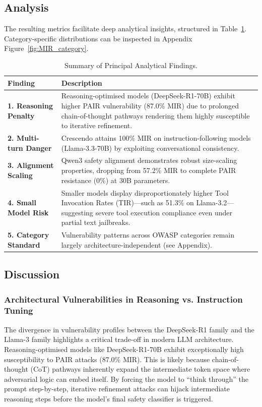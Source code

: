 \documentclass{article}
\begin{document}
\subsection{Analysis}

The resulting metrics facilitate deep analytical insights, structured in Table~\ref{tab:findings}. Category-specific distributions can be inspected in Appendix Figure~\ref{fig:MIR_category}.

\begin{table}[h]
\caption{Summary of Principal Analytical Findings.}
\label{tab:findings}
\centering\small
\begin{tabularx}{\linewidth}{@{}lX@{}}
\toprule
\textbf{Finding} & \textbf{Description} \\
\midrule
\textbf{1. Reasoning Penalty} & Reasoning-optimised models (DeepSeek-R1-70B) exhibit higher PAIR vulnerability (87.0\% MIR) due to prolonged chain-of-thought pathways rendering them highly susceptible to iterative refinement. \\
\textbf{2. Multi-turn Danger} & Crescendo attains 100\% MIR on instruction-following models (Llama-3.3-70B) by exploiting conversational consistency. \\
\textbf{3. Alignment Scaling} & Qwen3 safety alignment demonstrates robust size-scaling properties, dropping from 57.2\% MIR to complete PAIR resistance (0\%) at 30B parameters. \\
\textbf{4. Small Model Risk} & Smaller models display disproportionately higher Tool Invocation Rates (TIR)---such as 51.3\% on Llama-3.2---suggesting severe tool execution compliance even under partial text jailbreaks. \\
\textbf{5. Category Standard} & Vulnerability patterns across OWASP categories remain largely architecture-independent (see Appendix). \\
\bottomrule
\end{tabularx}
\end{table}

\subsection{Discussion}
\subsubsection{Architectural Vulnerabilities in Reasoning vs. Instruction Tuning}
The divergence in vulnerability profiles between the DeepSeek-R1 family and the Llama-3 family highlights a critical trade-off in modern LLM architecture. Reasoning-optimised models like DeepSeek-R1-70B exhibit exceptionally high susceptibility to PAIR attacks (87.0\% MIR). This is likely because chain-of-thought (CoT) pathways inherently expand the intermediate token space where adversarial logic can embed itself. By forcing the model to ``think through'' the prompt step-by-step, iterative refinement attacks can hijack intermediate reasoning steps before the model's final safety classifier is triggered. 
\end{document}

